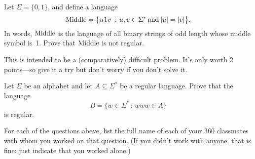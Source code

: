 \documentclass[11pt]{article}
\newcommand{\tinyspace}{\mspace{1mu}}
\newenvironment{mylist}[1]{\begin{list}{}{
	\setlength{\leftmargin}{#1}
	\setlength{\rightmargin}{0mm}
	\setlength{\labelsep}{2mm}
	\setlength{\labelwidth}{8mm}
	\setlength{\itemsep}{0mm}}}
	{\end{list}}
\newcounter{questioncounter}
\newenvironment{question}{
  \begin{mylist}{\parindent}
  \item[\stepcounter{questioncounter}
    \thequestioncounter.]}{
\end{mylist}}
\begin{document}

\begin{question}[4 points]
  Let $\Sigma = \{0,1\}$, and define a language
  \[
  \textup{Middle} = \bigl\{u\tinyspace 1\tinyspace v\,:\,u,v\in\Sigma^{\ast}\:
  \text{and} \:|u| = |v|\bigr\}.
  \]
  In words, $\textup{Middle}$ is the language of all binary strings of odd
  length whose middle symbol is~1.
  Prove that $\textup{Middle}$ is not regular.
\end{question}


\begin{question}[2 points]
  This is intended to be a (comparatively) difficult problem.
  It's only worth 2 points---so give it a try but don't worry if you don't solve
  it.

  Let $\Sigma$ be an alphabet and let $A\subseteq\Sigma^{\ast}$ be a regular
  language.
  Prove that the language
  \[
  B = \bigl\{w\in\Sigma^{\ast}\,:\,www\in A\bigr\}
  \]
  is regular.
\end{question}


\begin{question}[1 point]
  For each of the questions above, list the full name of each of your 360
  classmates with whom you worked on that question.
  (If you didn't work with anyone, that is fine: just indicate that you worked
  alone.)
\end{question}

\end{document}
